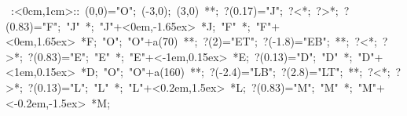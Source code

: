 
%


\hbox{
\xy    <1cm,0cm>:<0cm,1cm>::
       (0,0)="O"; (-3,0); (3,0) **\dir{-}; 
            ?(0.17)="J"; ?<*\dir{<}; ?>*\dir{>}; ?(0.83)="F";
         "J" *{\bullet}; "J"+<0em,-1.65ex> *{J};
         "F" *{\bullet}; "F"+<0em,1.65ex> *{F};
       "O"; "O"+a(70)  **\dir{}; ?(2)="ET"; ?(-1.8)="EB";
          **\dir{-}; ?<*\dir{<}; ?>*\dir{>}; ?(0.83)="E";
       "E" *{\bullet}; "E"+<-1em,0.15ex> *{E}; ?(0.13)="D";
       "D" *{\bullet}; "D"+<1em,0.15ex> *{D};
       "O"; "O"+a(160)  **\dir{}; ?(-2.4)="LB"; ?(2.8)="LT";
          **\dir{-}; ?<*\dir{<}; ?>*\dir{>}; ?(0.13)="L";
       "L" *{\bullet}; "L"+<0.2em,1.5ex> *{L}; ?(0.83)="M";
       "M" *{\bullet}; "M"+<-0.2em,-1.5ex> *{M};
       \endxy}




